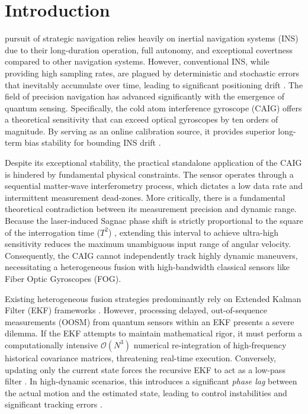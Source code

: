 \documentclass[journal]{IEEEtran}
\begin{document}
	\section{Introduction}
	 pursuit of strategic navigation relies heavily on inertial navigation systems (INS) due to their long-duration operation, full autonomy, and exceptional covertness compared to other navigation systems. However, conventional INS, while providing high sampling rates, are plagued by deterministic and stochastic errors that inevitably accumulate over time, leading to significant positioning drift \cite{b2}. The field of precision navigation has advanced significantly with the emergence of quantum sensing. Specifically, the cold atom interference gyroscope (CAIG) offers a theoretical sensitivity that can exceed optical gyroscopes by ten orders of magnitude. By serving as an online calibration source, it provides superior long-term bias stability for bounding INS drift \cite{b1}.
	
	Despite its exceptional stability, the practical standalone application of the CAIG is hindered by fundamental physical constraints. The sensor operates through a sequential matter-wave interferometry process, which dictates a low data rate and intermittent measurement dead-zones. More critically, there is a fundamental theoretical contradiction between its measurement precision and dynamic range. Because the laser-induced Sagnac phase shift is strictly proportional to the square of the interrogation time ($T^2$) \cite{b1, b7}, extending this interval to achieve ultra-high sensitivity reduces the maximum unambiguous input range of angular velocity. Consequently, the CAIG cannot independently track highly dynamic maneuvers, necessitating a heterogeneous fusion with high-bandwidth classical sensors like Fiber Optic Gyroscopes (FOG).
	
	Existing heterogeneous fusion strategies predominantly rely on Extended Kalman Filter (EKF) frameworks \cite{b1, b2}. However, processing delayed, out-of-sequence measurements (OOSM) from quantum sensors within an EKF presents a severe dilemma. If the EKF attempts to maintain mathematical rigor, it must perform a computationally intensive $\mathcal{O}(N^3)$ numerical re-integration of high-frequency historical covariance matrices, threatening real-time execution. Conversely, updating only the current state forces the recursive EKF to act as a low-pass filter \cite{b55}. In high-dynamic scenarios, this introduces a significant \textit{phase lag} between the actual motion and the estimated state, leading to control instabilities and significant tracking errors \cite{b23, b24}.
	
\end{document}
